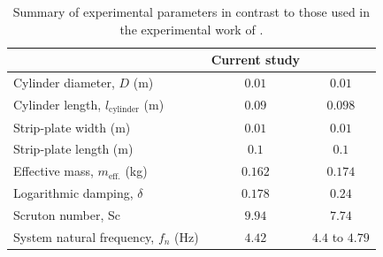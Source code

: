 \documentclass[oneside]{utmthesis}
\begin{document}
\begin{table}[!ht]
\centering
\caption{Summary of experimental parameters in contrast to those used in the experimental work of \citet{Koide2013}.} \label{tab:expParameter}
\vspace{\baselineskip}
\begin{tabular}{l c c}
  \hline
  \hline
                                           & Current study & \citet{Koide2013}\\
  \hline
Cylinder diameter, $D$ (m)                 & $0.01$        & $0.01$           \\
Cylinder length, $l_{\text{cylinder}}$ (m) & $0.09$        & $0.098$          \\
Strip-plate width (m)                      & $0.01$        & $0.01$           \\
Strip-plate length (m)                     & $0.1$         & $0.1$            \\
Effective mass, $m_{\text{eff.}}$ (kg)     & $0.162$       & $0.174$          \\
Logarithmic damping, $\delta$              & $0.178$       & $0.24$           \\
Scruton number, Sc                         & $9.94$        & $7.74$           \\
System natural frequency, $f_{n}$ (Hz)     & $4.42$        & $4.4$ to $4.79$  \\
  \hline
  \hline
\end{tabular}
\end{table}
\end{document}
